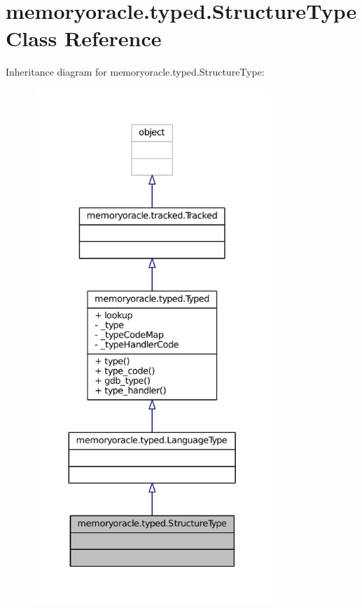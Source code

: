 \hypertarget{classmemoryoracle_1_1typed_1_1StructureType}{}\section{memoryoracle.\+typed.\+Structure\+Type Class Reference}
\label{classmemoryoracle_1_1typed_1_1StructureType}


Inheritance diagram for memoryoracle.\+typed.\+Structure\+Type\+:\nopagebreak
\begin{figure}[H]
\begin{center}
\leavevmode
\includegraphics[height=550pt]{classmemoryoracle_1_1typed_1_1StructureType__inherit__graph}
\end{center}
\end{figure}


